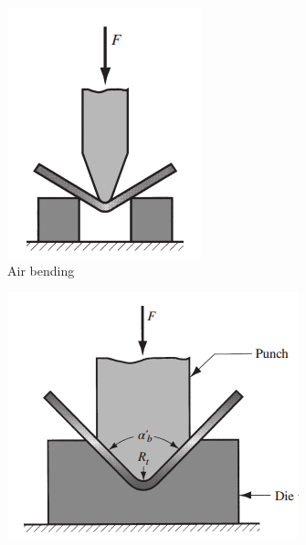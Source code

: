 \begin{figure}[h]
    \begin{tcolorbox}[arc=0pt,boxrule=0.5pt, colback=white]
        \centering
        \begin{subfigure}{0.4\textwidth}
            \centering
            \includegraphics[width=\textwidth]{chap3/images/air-bending}
            \caption{Air bending}
            \label{fig:air-bending}
        \end{subfigure}
        \hfill
        \begin{subfigure}{0.4\textwidth}
            \includegraphics[width=\textwidth]{chap3/images/v-bending}

\end{subfigure}
\end{tcolorbox}
\end{figure}
